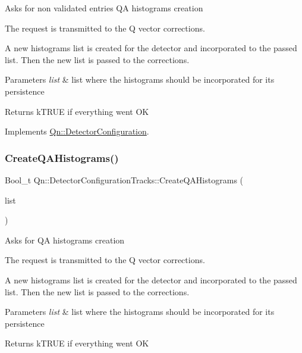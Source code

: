 Asks for non validated entries QA histograms creation

The request is transmitted to the Q vector corrections.

A new histograms list is created for the detector and incorporated to the passed list. Then the new list is passed to the corrections. 
\begin{DoxyParams}{Parameters}
{\em list} & list where the histograms should be incorporated for its persistence \\
\hline
\end{DoxyParams}
\begin{DoxyReturn}{Returns}
k\+T\+R\+UE if everything went OK 
\end{DoxyReturn}


Implements \mbox{\hyperlink{classQn_1_1DetectorConfiguration_ade61875d8e7a05dd413c94d6887ae4ac}{Qn\+::\+Detector\+Configuration}}.

\mbox{\label{classQn_1_1DetectorConfigurationTracks_a4ccffb90904f7769abc11c09f5217337}} 
\subsubsection{\texorpdfstring{Create\+Q\+A\+Histograms()}{CreateQAHistograms()}}
{\footnotesize\ttfamily Bool\+\_\+t Qn\+::\+Detector\+Configuration\+Tracks\+::\+Create\+Q\+A\+Histograms (\begin{DoxyParamCaption}\item[{T\+List $\ast$}]{list }\end{DoxyParamCaption})\hspace{0.3cm}{\ttfamily [virtual]}}

Asks for QA histograms creation

The request is transmitted to the Q vector corrections.

A new histograms list is created for the detector and incorporated to the passed list. Then the new list is passed to the corrections. 
\begin{DoxyParams}{Parameters}
{\em list} & list where the histograms should be incorporated for its persistence \\
\hline
\end{DoxyParams}
\begin{DoxyReturn}{Returns}
k\+T\+R\+UE if everything went OK 
\end{DoxyReturn}


